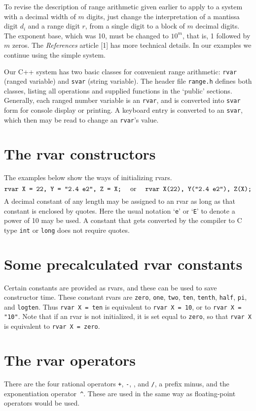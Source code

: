 To revise the description of range arithmetic given earlier to
apply to a system with a decimal width of $m$ digits,
just change the interpretation of a mantissa digit $d_i$ and a
range digit $r$, from a single digit to a block of $m$ decimal digits.
The exponent base, which was 10, must be changed to $10^m$, that
is, 1 followed by $m$ zeros. The {\sl References} article [1]
has more technical details. In our examples we continue
using the simple system.

Our C++ system has two basic classes for convenient range arithmetic: 
{\tt rvar} (ranged variable) and {\tt svar} (string variable). 
The header file {\tt range.h} defines both classes,
listing all operations and supplied functions
in the `public' sections. Generally,
each ranged number variable is an {\tt rvar}, and is converted
into {\tt svar} form for console display or printing. A keyboard
entry is converted to an {\tt svar}, which then may be read to
change an {\tt rvar}'s value.

\section{The rvar constructors}
The examples below show the ways of initializing rvars.
$$\hbox{{\tt rvar X = 22, Y = "2.4 e2", Z = X;} \quad or
\quad {\tt rvar X(22), Y("2.4 e2"), Z(X);}}$$
A decimal constant of any length may be assigned to an rvar as long 
as that constant is enclosed by quotes. Here the usual notation
`{\tt e}' or `{\tt E}' to denote a power of 10 may be used. A constant
that gets converted by the compiler to C type {\tt int} or {\tt long}
does not require quotes.

\section{Some precalculated rvar constants}
Certain constants are provided as
rvars, and these can be used to save constructor time. These constant rvars
are {\tt zero}, {\tt one}, {\tt two}, {\tt ten}, {\tt tenth}, {\tt half},
{\tt pi}, and {\tt logten}. Thus \hbox{\tt rvar X = ten}  is equivalent
to \hbox{\tt rvar X = 10}, or to \hbox{\tt rvar X = "10"}.
Note that if an rvar is not initialized, it is set equal
to {\tt zero}, so that {\tt rvar X} is equivalent to \hbox{\tt rvar X = zero}.
\section{The rvar operators}
There are the four rational operators {\tt +},  {\tt -}, {\tt *}, and {\tt /},
a prefix minus, and the exponentiation operator~{\tt \^}.
These are used in the same way as floating-point operators would be
used. 

